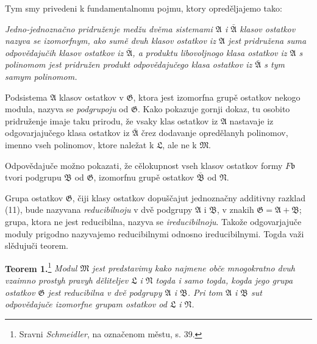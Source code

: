 \documentclass[11pt]{article}
\providecommand{\mM}{\mathfrak M}
\providecommand{\mN}{\mathfrak N}
\providecommand{\mL}{\mathfrak L}
\providecommand{\mG}{\mathfrak G}
\providecommand{\mA}{\mathfrak A}
\providecommand{\mB}{\mathfrak B}
\providecommand{\mbarA}{\bar{\mathfrak A}}
\providecommand{\mbarB}{\bar{\mathfrak B}}
\providecommand{\mb}{\mathfrak b}
\begin{document}
Tym smy privedeni k fundamentalnomu pojmu, ktory opreděljajemo tako:

\textit{Jedno-jednoznačno pridruženje medžu dvěma sistemami \(\mA\) i \(\mbarA\) klasov ostatkov nazyva se izomorfnym, ako sumě dvuh klasov ostatkov iz \(\mA\) jest pridružena suma odpovědajučih klasov ostatkov iz \(\mbarA\), a produktu libovoljnogo klasa ostatkov iz \(\mA\) s polinomom jest pridružen produkt odpovědajučego klasa ostatkov iz \(\mbarA\) s tym samym polinomom.}

Podsistema \(\mA\) klasov ostatkov v \(\mG\), ktora jest izomorfna grupě ostatkov nekogo modula, nazyva se \textit{podgrupoju} od \(\mG\). Kako pokazuje gornji dokaz, tu osobito pridruženje imaje taku prirodu, že vsaky klas ostatkov iz \(\mA\) nastavaje iz odgovarjajučego klasa ostatkov iz \(\mbarA\) črez dodavanje opredělanyh polinomov, imenno vseh polinomov, ktore naležat k \(\mL\), ale ne k \(\mM\).

Odpovědajuče možno pokazati, že cělokupnost vseh klasov ostatkov formy \(F\mb\) tvori podgrupu \(\mB\) od \(\mG\), izomorfnu grupě ostatkov \(\mbarB\) od \(\mN\).

Grupa ostatkov \(\mG\), čiji klasy ostatkov dopuščajut jednoznačny additivny razklad (11), bude nazyvana \textit{reducibilnoju} v dvě podgrupy \(\mA\) i \(\mB\), v znakih \(\mG=\mA+\mB\); grupa, ktora ne jest reducibilna, nazyva se \textit{ireducibilnoju}. Takože odgovarjajuče moduly prigodno nazyvajemo reducibilnymi odnosno ireducibilnymi. Togda važi slědujuči teorem.

\textbf{Teorem 1.}\footnote{Sravni \emph{Schmeidler}, na označenom městu, s. 39.} \textit{Modul \(\mM\) jest predstavimy kako najmene obče mnogokratno dvuh vzaimno prostyh pravyh děliteljev \(\mL\) i \(\mN\) togda i samo togda, kogda jego grupa ostatkov \(\mG\) jest reducibilna v dvě podgrupy \(\mA\) i \(\mB\). Pri tom \(\mA\) i \(\mB\) sut odpovědajuče izomorfne grupam ostatkov od \(\mL\) i \(\mN\).}
\end{document}
